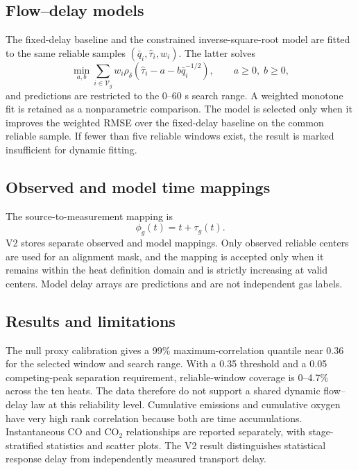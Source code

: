 \subsection{Flow--delay models}
The fixed-delay baseline and the constrained inverse-square-root model are fitted to the same reliable samples $(\bar q_i,\widehat\tau_i,w_i)$. The latter solves
\[
\min_{a,b}\sum_{i\in\mathcal V_g}w_i\rho_\delta\left(\widehat\tau_i-a-b\bar q_i^{-1/2}\right),
\qquad a\geq0,\;b\geq0,
\]
and predictions are restricted to the 0--60 s search range. A weighted monotone fit is retained as a nonparametric comparison. The model is selected only when it improves the weighted RMSE over the fixed-delay baseline on the common reliable sample. If fewer than five reliable windows exist, the result is marked insufficient for dynamic fitting.

\subsection{Observed and model time mappings}
The source-to-measurement mapping is
\[
\phi_g(t)=t+\tau_g(t).
\]
V2 stores separate observed and model mappings. Only observed reliable centers are used for an alignment mask, and the mapping is accepted only when it remains within the heat definition domain and is strictly increasing at valid centers. Model delay arrays are predictions and are not independent gas labels.

\subsection{Results and limitations}
The null proxy calibration gives a 99\% maximum-correlation quantile near 0.36 for the selected window and search range. With a 0.35 threshold and a 0.05 competing-peak separation requirement, reliable-window coverage is 0--4.7\% across the ten heats. The data therefore do not support a shared dynamic flow--delay law at this reliability level. Cumulative emissions and cumulative oxygen have very high rank correlation because both are time accumulations. Instantaneous CO and CO$_2$ relationships are reported separately, with stage-stratified statistics and scatter plots. The V2 result distinguishes statistical response delay from independently measured transport delay.
